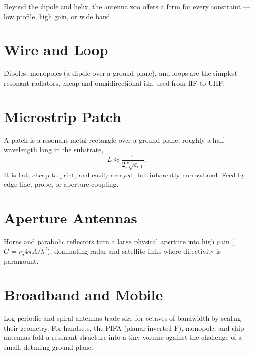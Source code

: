 Beyond the dipole and helix, the antenna zoo offers a form for every constraint
--- low profile, high gain, or wide band.

\section{Wire and Loop}
Dipoles, monopoles (a dipole over a ground plane), and loops are the simplest
resonant radiators, cheap and omnidirectional-ish, used from HF to UHF.

\section{Microstrip Patch}
A patch is a resonant metal rectangle over a ground plane, roughly a half
wavelength long in the substrate,
\[ L \approx \frac{c}{2 f\sqrt{\varepsilon_{\text{eff}}}}. \]
It is flat, cheap to print, and easily arrayed, but inherently narrowband. Feed
by edge line, probe, or aperture coupling.

\section{Aperture Antennas}
Horns and parabolic reflectors turn a large physical aperture into high gain
($G = \eta_a 4\pi A/\lambda^2$), dominating radar and satellite links where
directivity is paramount.

\section{Broadband and Mobile}
Log-periodic and spiral antennas trade size for octaves of bandwidth by scaling
their geometry. For handsets, the PIFA (planar inverted-F), monopole, and chip
antennas fold a resonant structure into a tiny volume against the challenge of a
small, detuning ground plane.
